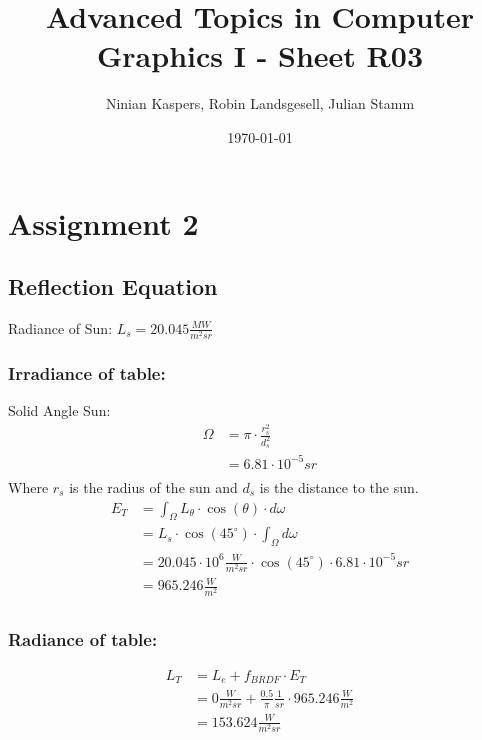 \documentclass{article}
\title{Advanced Topics in Computer Graphics I - Sheet R03}
\author{Ninian Kaspers, Robin Landsgesell, Julian Stamm}
\date{\today}
\begin{document}
    \maketitle

    \section*{Assignment 2}
    \subsection*{Reflection Equation}
    Radiance of Sun: $L_s = 20.045 \frac{MW}{m^2 sr}$ \\
    \subsubsection*{Irradiance of table:}
    Solid Angle Sun:
    \begin{align*}
        \Omega &= \pi \cdot \frac{r_s^2}{d_s^2} \\
        &= 6.81 \cdot 10^{-5} sr \\
    \end{align*}
    Where $r_s$ is the radius of the sun and $d_s$ is the distance to the sun.\\
    \begin{align*}
        E_T &= \int_{\Omega} L_{\theta} \cdot \cos(\theta) \cdot d\omega \\
        &= L_s \cdot \cos(45^{\circ}) \cdot \int_{\Omega} d\omega \\
        &= 20.045 \cdot 10^6 \frac{W}{m^2 sr} \cdot \cos(45^{\circ}) \cdot 6.81 \cdot 10^{-5} sr \\
        &= 965.246 \frac{W}{m^2} \\
    \end{align*}
    \subsubsection*{Radiance of table:}
    \begin{align*}
        L_T &= L_e + f_{BRDF} \cdot E_T \\
        &= 0 \frac{W}{m^2 sr} + \frac{0.5}{\pi} \frac{1}{sr} \cdot 965.246 \frac{W}{m^2} \\
        &= 153.624 \frac{W}{m^2 sr} \\
    \end{align*}
\end{document}
